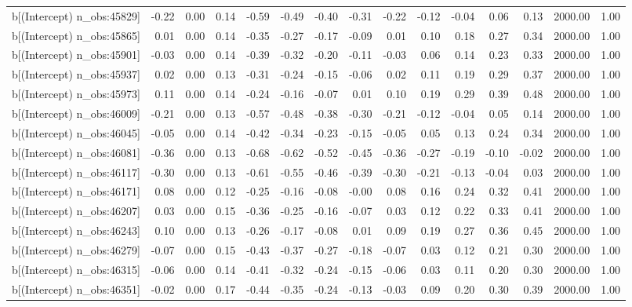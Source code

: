 \begin{table}[ht]
\begin{tabular}{rrrrrrrrrrrrrrr}
  b[(Intercept) n\_obs:45829] & -0.22 & 0.00 & 0.14 & -0.59 & -0.49 & -0.40 & -0.31 & -0.22 & -0.12 & -0.04 & 0.06 & 0.13 & 2000.00 & 1.00 \\ 
  b[(Intercept) n\_obs:45865] & 0.01 & 0.00 & 0.14 & -0.35 & -0.27 & -0.17 & -0.09 & 0.01 & 0.10 & 0.18 & 0.27 & 0.34 & 2000.00 & 1.00 \\ 
  b[(Intercept) n\_obs:45901] & -0.03 & 0.00 & 0.14 & -0.39 & -0.32 & -0.20 & -0.11 & -0.03 & 0.06 & 0.14 & 0.23 & 0.33 & 2000.00 & 1.00 \\ 
  b[(Intercept) n\_obs:45937] & 0.02 & 0.00 & 0.13 & -0.31 & -0.24 & -0.15 & -0.06 & 0.02 & 0.11 & 0.19 & 0.29 & 0.37 & 2000.00 & 1.00 \\ 
  b[(Intercept) n\_obs:45973] & 0.11 & 0.00 & 0.14 & -0.24 & -0.16 & -0.07 & 0.01 & 0.10 & 0.19 & 0.29 & 0.39 & 0.48 & 2000.00 & 1.00 \\ 
  b[(Intercept) n\_obs:46009] & -0.21 & 0.00 & 0.13 & -0.57 & -0.48 & -0.38 & -0.30 & -0.21 & -0.12 & -0.04 & 0.05 & 0.14 & 2000.00 & 1.00 \\ 
  b[(Intercept) n\_obs:46045] & -0.05 & 0.00 & 0.14 & -0.42 & -0.34 & -0.23 & -0.15 & -0.05 & 0.05 & 0.13 & 0.24 & 0.34 & 2000.00 & 1.00 \\ 
  b[(Intercept) n\_obs:46081] & -0.36 & 0.00 & 0.13 & -0.68 & -0.62 & -0.52 & -0.45 & -0.36 & -0.27 & -0.19 & -0.10 & -0.02 & 2000.00 & 1.00 \\ 
  b[(Intercept) n\_obs:46117] & -0.30 & 0.00 & 0.13 & -0.61 & -0.55 & -0.46 & -0.39 & -0.30 & -0.21 & -0.13 & -0.04 & 0.03 & 2000.00 & 1.00 \\ 
  b[(Intercept) n\_obs:46171] & 0.08 & 0.00 & 0.12 & -0.25 & -0.16 & -0.08 & -0.00 & 0.08 & 0.16 & 0.24 & 0.32 & 0.41 & 2000.00 & 1.00 \\ 
  b[(Intercept) n\_obs:46207] & 0.03 & 0.00 & 0.15 & -0.36 & -0.25 & -0.16 & -0.07 & 0.03 & 0.12 & 0.22 & 0.33 & 0.41 & 2000.00 & 1.00 \\ 
  b[(Intercept) n\_obs:46243] & 0.10 & 0.00 & 0.13 & -0.26 & -0.17 & -0.08 & 0.01 & 0.09 & 0.19 & 0.27 & 0.36 & 0.45 & 2000.00 & 1.00 \\ 
  b[(Intercept) n\_obs:46279] & -0.07 & 0.00 & 0.15 & -0.43 & -0.37 & -0.27 & -0.18 & -0.07 & 0.03 & 0.12 & 0.21 & 0.30 & 2000.00 & 1.00 \\ 
  b[(Intercept) n\_obs:46315] & -0.06 & 0.00 & 0.14 & -0.41 & -0.32 & -0.24 & -0.15 & -0.06 & 0.03 & 0.11 & 0.20 & 0.30 & 2000.00 & 1.00 \\ 
  b[(Intercept) n\_obs:46351] & -0.02 & 0.00 & 0.17 & -0.44 & -0.35 & -0.24 & -0.13 & -0.03 & 0.09 & 0.20 & 0.30 & 0.39 & 2000.00 & 1.00 \\ 

\end{tabular}
\end{table}
